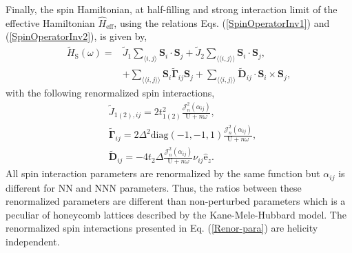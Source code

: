 \documentclass[aps,prl,twocolumn,amsmath,amssymb,nobibnotes]{revtex4-1}%
\newcommand{\n}{\nonumber}
\newcommand{\bs}{\boldsymbol}
\begin{document}
Finally, the spin Hamiltonian, at half-filling and strong interaction limit of the effective Hamiltonian $\hat{H}_{\text{eff}}$, using the relations Eqs. (\ref{SpinOperatorInv1}) and (\ref{SpinOperatorInv2}), is given by,
\begin{align}
\label{MKMHeffw}
\tilde{H}_{\text{S}}(\omega) =& \tilde{J}_{1}\sum_{\langle i,j \rangle} \bs{S}_i\cdot\bs{S}_j + \tilde{J}_{2}\sum_{\langle \langle i,j \rangle \rangle} \bs{S}_i\cdot\bs{S}_j, \n \\
&+ \sum_{\langle \langle i,j \rangle \rangle} \bs{S}_i \tilde{\bs{\Gamma}}_{ij} \bs{S}_j +\sum_{\langle \langle i,j \rangle \rangle} \tilde{\bs{D}}_{ij}\cdot \bs{S}_i \times \bs{S}_j,
\end{align}
with the following renormalized spin interactions,
\begin{subequations}
\label{Renor-para}
\begin{align}
&\tilde{J}_{1(2),ij} = 2t_{1(2)}^2\frac{\mathcal{J}_{n}^2(\alpha_{ij})}{\text{U}+n\omega}, \\ 
&\tilde{\bs{\Gamma}}_{ij} = 2\Delta^2 \text{diag}(-1,-1,1) \frac{\mathcal{J}_{n}^2(\alpha_{ij})}{\text{U}+n\omega},\\ 
&\tilde{\bs{D}}_{ij} = - 4 t_2 \Delta \frac{\mathcal{J}_{n}^2(\alpha_{ij})}{\text{U}+n\omega} \nu_{ij} \hat{\mathrm{e}}_z. 
\end{align}
\end{subequations}
All spin interaction parameters are renormalized by the same function but $\alpha_{ij}$ is different for NN and NNN parameters. Thus, the ratios between these renormalized parameters are different than non-perturbed parameters which is a peculiar of honeycomb lattices described by the Kane-Mele-Hubbard model. The renormalized spin interactions presented in Eq. (\ref{Renor-para}) are helicity independent.
\end{document}
